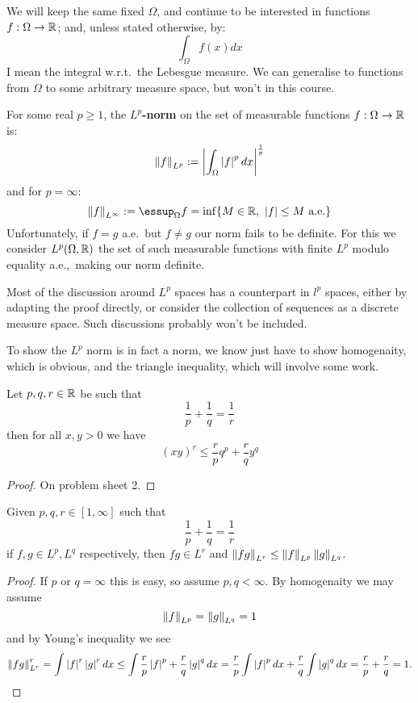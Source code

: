 \documentclass{article}
\begin{document}
We will keep the same fixed $\Omega$, and continue to be interested in functions $f:\Omega\rightarrow\mathbb{R}$; and, unless stated otherwise, by: \[
\int_\Omega f(x)dx
\] I mean the integral w.r.t.~the Lebesgue measure. We can generalise to functions from $\Omega$ to some arbitrary measure space, but won't in this course.

\begin{definition}
    For some real $p\geq 1$, the \textbf{$L^p$-norm} on the set of measurable functions $f:\Omega\rightarrow \mathbb{R}$ is: \[
    \left\lVert f \right\rVert_{L^p} := \left| \int_\Omega \left| f \right|^pdx \right|^{\frac{1}{p}}
    \]
    and for $p=\infty$: \[
    \norm{f}_{L^\infty} := \essup_\Omega f = \inf\{M\in\bR, \ \abs{f}\leq M \text{ a.e.}\}
    \]
    Unfortunately, if $f=g$ a.e.~but $f\neq g$ our norm fails to be definite. For this we consider $L^p(\Omega,\mathbb{R})$ the set of such measurable functions with finite $L^p$ modulo equality a.e.,~making our norm definite.
\end{definition}

Most of the discussion around $L^p$ spaces has a counterpart in $l^p$ spaces, either by adapting the proof directly, or consider the collection of sequences as a discrete measure space. Such discussions probably won't be included.

To show the $L^p$ norm is in fact a norm, we know just have to show homogenaity, which is obvious, and the triangle inequality, which will involve some work.

\begin{lemma}
    Let $p,q,r\in\mathbb{R}$ be such that \[
    \frac{1}{p} + \frac{1}{q} = \frac{1}{r}
    \] then for all $x,y>0$ we have \[
        (xy)^r \leq \frac{r}{p}q^p + \frac{r}{q}y^q
    \]\begin{proof}
        On problem sheet 2.
    \end{proof}
\end{lemma}

\begin{proposition}
    Given $p,q,r\in[1,\infty]$ such that \[
    \frac{1}{p} + \frac{1}{q} = \frac{1}{r}
    \] if $f,g\in L^p,L^q$ respectively, then $fg\in L^r$ and $\left\lVert fg \right\rVert_{L^r}\leq\left\lVert f \right\rVert_{L^p}\left\lVert g \right\rVert_{L^q}$.\begin{proof}
        If $p$ or $q=\infty$ this is easy, so assume $p,q<\infty$. By homogenaity we may assume \[\left\lVert f \right\rVert_{L^p} = \left\lVert g \right\rVert_{L^q} = 1\] and by Young's inequality we see \[
            \left\lVert fg \right\rVert_{L^r}^r = \int\left| f \right|^r\left| g \right|^rdx \leq \int\frac{r}{p}\left| f \right|^p + \frac{r}{q}\left| g \right|^qdx = \frac{r}{p}\int\left| f \right|^pdx + \frac{r}{q}\int\left| g \right|^qdx = \frac{r}{p} + \frac{r}{q} = 1.\qedhere
        \]
    \end{proof}
\end{proposition}
\end{document}
